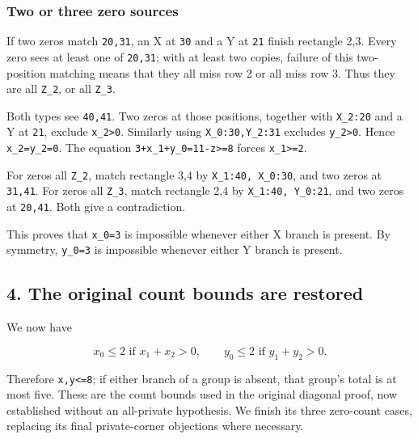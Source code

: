 \documentclass[
  10pt,
]{article}
\begin{document}
\hypertarget{two-or-three-zero-sources}{%
\subsubsection*{Two or three zero
sources}\label{two-or-three-zero-sources}}

If two zeros match \texttt{20,31}, an X at \texttt{30} and a Y at
\texttt{21} finish rectangle 2,3. Every zero sees at least one of
\texttt{20,31}; with at least two copies, failure of this two-position
matching means that they all miss row 2 or all miss row 3. Thus they are
all \texttt{Z\_2}, or all \texttt{Z\_3}.

Both types see \texttt{40,41}. Two zeros at those positions, together
with \texttt{X\_2:20} and a Y at \texttt{21}, exclude
\texttt{x\_2\textgreater{}0}. Similarly using \texttt{X\_0:30,Y\_2:31}
excludes \texttt{y\_2\textgreater{}0}. Hence \texttt{x\_2=y\_2=0}. The
equation \texttt{3+x\_1+y\_0=11-z\textgreater{}=8} forces
\texttt{x\_1\textgreater{}=2}.

For zeros all \texttt{Z\_2}, match rectangle 3,4 by
\texttt{X\_1:40,\ X\_0:30}, and two zeros at \texttt{31,41}. For zeros
all \texttt{Z\_3}, match rectangle 2,4 by \texttt{X\_1:40,\ Y\_0:21},
and two zeros at \texttt{20,41}. Both give a contradiction.

This proves that \texttt{x\_0=3} is impossible whenever either X branch
is present. By symmetry, \texttt{y\_0=3} is impossible whenever either Y
branch is present.

\hypertarget{the-original-count-bounds-are-restored}{%
\subsection*{4. The original count bounds are
restored}\label{the-original-count-bounds-are-restored}}

We now have

\[
x_0\le2\text{ if }x_1+x_2>0,
\qquad y_0\le2\text{ if }y_1+y_2>0.
\]

Therefore \texttt{x,y\textless{}=8}; if either branch of a group is
absent, that group's total is at most five. These are the count bounds
used in the original diagonal proof, now established without an
all-private hypothesis. We finish its three zero-count cases, replacing
its final private-corner objections where necessary.
\end{document}
